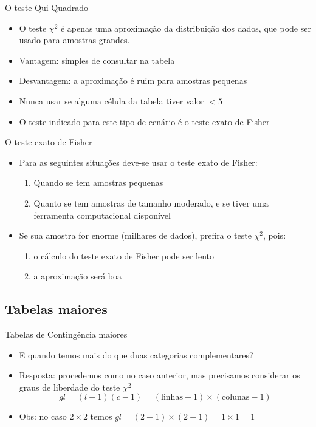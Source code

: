 \documentclass{beamer}
\begin{document}
\begin{frame}{O teste Qui-Quadrado}
  \begin{itemize}
  \item O teste $\chi^2$ é apenas uma aproximação da distribuição dos
    dados, que pode ser usado para amostras grandes.
  \item Vantagem: simples de consultar na tabela
  \item Desvantagem: a aproximação é ruim para amostras pequenas
  \item Nunca usar se alguma célula da tabela tiver valor \alert{$<5$}
  \item O teste indicado para este tipo de cenário é o \alert{teste
      exato de Fisher}
  \end{itemize}
\end{frame}

\begin{frame}{O teste exato de Fisher}
  \begin{itemize}
  \item Para as seguintes situações deve-se usar o teste exato de
    Fisher:
    \begin{enumerate}
    \item Quando se tem amostras pequenas
    \item Quanto se tem amostras de tamanho moderado, e se tiver uma
      ferramenta computacional disponível
    \end{enumerate}
  \item Se sua amostra for enorme (milhares de dados), prefira o teste
    $\chi^2$, pois:
    \begin{enumerate}
    \item o cálculo do teste exato de Fisher pode ser lento
    \item a aproximação será boa
    \end{enumerate}
  \end{itemize}
\end{frame}

\subsection{Tabelas maiores}

\begin{frame}{Tabelas de Contingência maiores}
  \begin{itemize}
  \item E quando temos mais do que duas categorias complementares?
  \item Resposta: procedemos como no caso anterior, mas precisamos
    considerar os \alert{graus de liberdade} do teste $\chi^2$
    \begin{displaymath}
        gl = (l-1)(c-1) = (\text{linhas} -1)\times (\text{colunas}-1)
    \end{displaymath}
  \item Obs: no caso $2 \times 2$ temos $gl = (2-1) \times (2-1)=1
    \times 1 = 1$
  \end{itemize}
\end{frame}
\end{document}
